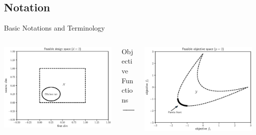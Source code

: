 \documentclass[aspectratio=169]{beamer}
\begin{document}
\subsection{Notation}
\begin{frame}{Basic Notations and Terminology}
\begin{columns}
\begin{column}{.42\textwidth}
\includegraphics[width=\textwidth]{feasible_design.eps}\\
\end{column}
\begin{column}{.15\textwidth}
\begin{center}
{\tiny
Objective Functions\\
}
$\xrightarrow{\hspace*{2cm}}$
\end{center}
\end{column}
\begin{column}{.42\textwidth}
\includegraphics[width=\textwidth]{convex_pareto.eps}\\
\end{column}
\end{columns}
\end{frame}
\end{document}
